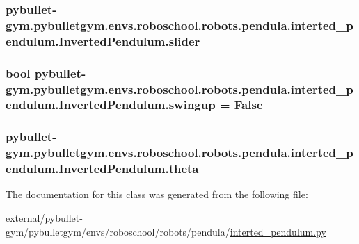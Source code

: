 \subsubsection[{\texorpdfstring{slider}{slider}}]{\setlength{\rightskip}{0pt plus 5cm}pybullet-\/gym.\+pybulletgym.\+envs.\+roboschool.\+robots.\+pendula.\+interted\+\_\+pendulum.\+Inverted\+Pendulum.\+slider}\hypertarget{classpybullet-gym_1_1pybulletgym_1_1envs_1_1roboschool_1_1robots_1_1pendula_1_1interted__pendulum_1_1_inverted_pendulum_a43b4cd6dbb15743754620c14a44d4dee}{}\label{classpybullet-gym_1_1pybulletgym_1_1envs_1_1roboschool_1_1robots_1_1pendula_1_1interted__pendulum_1_1_inverted_pendulum_a43b4cd6dbb15743754620c14a44d4dee}
\subsubsection[{\texorpdfstring{swingup}{swingup}}]{\setlength{\rightskip}{0pt plus 5cm}bool pybullet-\/gym.\+pybulletgym.\+envs.\+roboschool.\+robots.\+pendula.\+interted\+\_\+pendulum.\+Inverted\+Pendulum.\+swingup = False\hspace{0.3cm}{\ttfamily [static]}}\hypertarget{classpybullet-gym_1_1pybulletgym_1_1envs_1_1roboschool_1_1robots_1_1pendula_1_1interted__pendulum_1_1_inverted_pendulum_a750e33fd408bd8eb41e05deffb15ed56}{}\label{classpybullet-gym_1_1pybulletgym_1_1envs_1_1roboschool_1_1robots_1_1pendula_1_1interted__pendulum_1_1_inverted_pendulum_a750e33fd408bd8eb41e05deffb15ed56}
\subsubsection[{\texorpdfstring{theta}{theta}}]{\setlength{\rightskip}{0pt plus 5cm}pybullet-\/gym.\+pybulletgym.\+envs.\+roboschool.\+robots.\+pendula.\+interted\+\_\+pendulum.\+Inverted\+Pendulum.\+theta}\hypertarget{classpybullet-gym_1_1pybulletgym_1_1envs_1_1roboschool_1_1robots_1_1pendula_1_1interted__pendulum_1_1_inverted_pendulum_a12704b2e28afe563b477ed8f5c1162fb}{}\label{classpybullet-gym_1_1pybulletgym_1_1envs_1_1roboschool_1_1robots_1_1pendula_1_1interted__pendulum_1_1_inverted_pendulum_a12704b2e28afe563b477ed8f5c1162fb}


The documentation for this class was generated from the following file\+:\begin{DoxyCompactItemize}
\item 
external/pybullet-\/gym/pybulletgym/envs/roboschool/robots/pendula/\hyperlink{interted__pendulum_8py}{interted\+\_\+pendulum.\+py}\end{DoxyCompactItemize}
